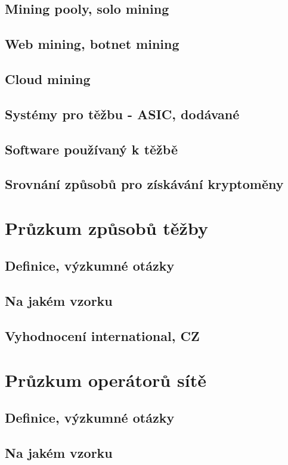 \documentclass[
  printed, %
  table,   %
  nolof,     %
  nolot,     %
           oneside, color
]{fithesis3}
\begin{document}
\section{Mining pooly, solo mining}
\section{Web mining, botnet mining}
\section{Cloud mining}
\section{Systémy pro těžbu - ASIC, dodávané}
\section{Software používaný k těžbě}
\section{Srovnání způsobů pro získávání kryptoměny}

\chapter{Průzkum způsobů těžby}
\section{Definice, výzkumné otázky}
\section{Na jakém vzorku}
\section{Vyhodnocení international, CZ}



\chapter{Průzkum operátorů sítě}
\section{Definice, výzkumné otázky}
\section{Na jakém vzorku}
\end{document}
